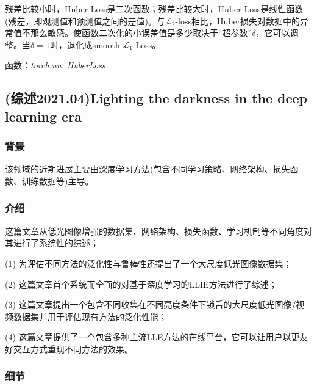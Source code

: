 \documentclass[letterpaper,12pt]{article}
\begin{document}
			残差比较小时，Huber Loss是二次函数；残差比较大时，Huber Loss是线性函数(残差，即观测值和预测值之间的差值)。与$\mathcal{L}_2$-loss相比，Huber损失对数据中的异常值不那么敏感。使函数二次化的小误差值是多少取决于“超参数”$\delta$，它可以调整。当$\delta=1$时，退化成smooth $\mathcal{L}_1$ Loss。
	
			函数：\textit{torch.nn. HuberLoss}
	
	\subsection{(综述2021.04)Lighting the darkness in the deep learning era}
	
	\subsubsection{背景}
	
	该领域的近期进展主要由深度学习方法(包含不同学习策略、网络架构、损失函数、训练数据等)主导。
	
	\subsubsection{介绍}
	
	这篇文章从低光图像增强的数据集、网络架构、损失函数、学习机制等不同角度对其进行了系统性的综述；
	
	(1) 为评估不同方法的泛化性与鲁棒性还提出了一个大尺度低光图像数据集；
	
	(2) 这篇文章首个系统而全面的对基于深度学习的LLIE方法进行了综述；
	
	(3) 这篇文章提出一个包含不同收集在不同亮度条件下锁舌的大尺度低光图像/视频数据集并用于评估现有方法的泛化性能；
	
	(4) 这篇文章提供了一个包含多种主流LLE方法的在线平台，它可以让用户以更友好交互方式重现不同方法的效果。
	
	
	\subsubsection{细节}
	
	\renewcommand{\tablename}{Table}
	
	
\end{document}
